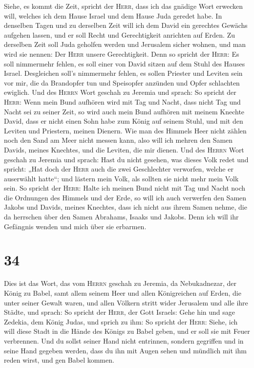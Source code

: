  Siehe, es kommt die Zeit, spricht der \textsc{Herr},
dass ich das gnädige Wort erwecken will, welches ich dem Hause Israel
und dem Hause Juda geredet habe.  In denselben Tagen und
zu derselben Zeit will ich dem David ein gerechtes Gewächs aufgehen
lassen, und er soll Recht und Gerechtigkeit anrichten auf Erden.
 Zu derselben Zeit soll Juda geholfen werden und
Jerusalem sicher wohnen, und man wird sie nennen: Der \textsc{Herr}
unsere Gerechtigkeit.  Denn so spricht der \textsc{Herr}:
Es soll nimmermehr fehlen, es soll einer von David sitzen auf dem Stuhl
des Hauses Israel.  Desgleichen soll's nimmermehr fehlen,
es sollen Priester und Leviten sein vor mir, die da Brandopfer tun und
Speisopfer anzünden und Opfer schlachten ewiglich.  Und
des \textsc{Herrn} Wort geschah zu Jeremia und sprach: 
So spricht der \textsc{Herr}: Wenn mein Bund aufhören wird mit Tag und
Nacht, dass nicht Tag und Nacht sei zu seiner Zeit,  so
wird auch mein Bund aufhören mit meinem Knechte David, dass er nicht
einen Sohn habe zum König auf seinem Stuhl, und mit den Leviten und
Priestern, meinen Dienern.  Wie man des Himmels Heer
nicht zählen noch den Sand am Meer nicht messen kann, also will ich
mehren den Samen Davids, meines Knechtes, und die Leviten, die mir
dienen.  Und des \textsc{Herrn} Wort geschah zu Jeremia
und sprach:  Hast du nicht gesehen, was dieses Volk redet
und spricht: „Hat doch der \textsc{Herr} auch die zwei Geschlechter
verworfen, welche er auserwählt hatte``; und lästern mein Volk, als
sollten sie nicht mehr mein Volk sein.  So spricht der
\textsc{Herr}: Halte ich meinen Bund nicht mit Tag und Nacht noch die
Ordnungen des Himmels und der Erde,  so will ich auch
verwerfen den Samen Jakobs und Davids, meines Knechtes, dass ich nicht
aus ihrem Samen nehme, die da herrschen über den Samen Abrahams, Isaaks
und Jakobs. Denn ich will ihr Gefängnis wenden und mich über sie
erbarmen.

\hypertarget{section-33}{%
\section{34}\label{section-33}}

 Dies ist das Wort, das vom \textsc{Herrn} geschah zu
Jeremia, da Nebukadnezar, der König zu Babel, samt allem seinem Heer und
allen Königreichen auf Erden, die unter seiner Gewalt waren, und allen
Völkern stritt wider Jerusalem und alle ihre Städte, und sprach:
 So spricht der \textsc{Herr}, der Gott Israels: Gehe hin
und sage Zedekia, dem König Judas, und sprich zu ihm: So spricht der
\textsc{Herr}: Siehe, ich will diese Stadt in die Hände des Königs zu
Babel geben, und er soll sie mit Feuer verbrennen.  Und du
sollst seiner Hand nicht entrinnen, sondern gegriffen und in seine Hand
gegeben werden, dass du ihn mit Augen sehen und mündlich mit ihm reden
wirst, und gen Babel kommen.

